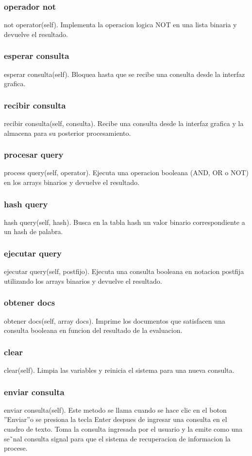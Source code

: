 \subsubsection{operador not}
not operator(self). Implementa la operacion logica NOT en una lista binaria y devuelve el resultado.
\subsubsection{esperar consulta}
esperar consulta(self). Bloquea hasta que se recibe una consulta desde la interfaz grafica.
\subsubsection{recibir consulta}
recibir consulta(self, consulta). Recibe una consulta desde la interfaz grafica y la almacena para
su posterior procesamiento.
\subsubsection{procesar query}
process query(self, operator). Ejecuta una operacion booleana (AND, OR o NOT) en los arrays
binarios y devuelve el resultado.
\subsubsection{hash query}
hash query(self, hash). Busca en la tabla hash un valor binario correspondiente a un hash de
palabra.
\subsubsection{ejecutar query}
ejecutar query(self, postfijo). Ejecuta una consulta booleana en notacion postfija utilizando los
arrays binarios y devuelve el resultado.
\subsubsection{obtener docs}
obtener docs(self, array docs). Imprime los documentos que satisfacen una consulta booleana en
funcion del resultado de la evaluacion.
\subsubsection{clear}
clear(self). Limpia las variables y reinicia el sistema para una nueva consulta.
\subsubsection{enviar consulta}
enviar consulta(self). Este metodo se llama cuando se hace clic en el boton ”Enviar”o se presiona
la tecla Enter despues de ingresar una consulta en el cuadro de texto. Toma la consulta ingresada
por el usuario y la emite como una se˜nal consulta signal para que el sistema de recuperacion de
informacion la procese.
